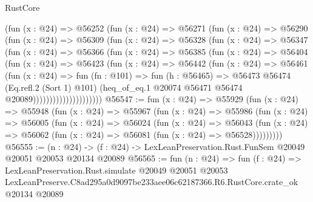 \begin{lexlean}{RustCore}
\begin{coremodule}
                  (fun (x : @24) =>
                  @56252
                    (fun (x : @24) =>
                    @56271
                      (fun (x : @24) =>
                      @56290
                        (fun (x : @24) =>
                        @56309
                          (fun (x : @24) =>
                          @56328
                            (fun (x : @24) =>
                            @56347
                              (fun (x : @24) =>
                              @56366
                                (fun (x : @24) =>
                                @56385
                                  (fun (x : @24) =>
                                  @56404
                                    (fun (x : @24) =>
                                    @56423
                                      (fun (x : @24) =>
                                      @56442
                                        (fun (x : @24) =>
                                        @56461
                                          (fun (x : @24) =>
                                          fun (fn : @101) =>
                                          fun (h : @56465) =>
                                          @56473
                                            @56474
                                            (Eq.refl.{2} (Sort 1) @101)
                                            (heq_of_eq.{1}
                                              @20074
                                              @56471
                                              @56474
                                              @20089)))))))))))))))))))))
@56547 := fun (x : @24) =>
  @55929
    (fun (x : @24) =>
    @55948
      (fun (x : @24) =>
      @55967
        (fun (x : @24) =>
        @55986
          (fun (x : @24) =>
          @56005
            (fun (x : @24) =>
            @56024
              (fun (x : @24) =>
              @56043
                (fun (x : @24) => @56062 (fun (x : @24) => @56081 (fun (x : @24) => @56528)))))))))
@56555 := (n : @24) ->
  (f : @24) -> LexLeanPreservation.Rust.FunSem @20049 @20051 @20053 @20134 @20089
@56565 := fun (n : @24) =>
  fun (f : @24) =>
  LexLeanPreservation.Rust.simulate
    @20049
    @20051
    @20053
    LexLeanPreserve.C8ad295a0d9097be233aee06c62187366.R6.RustCore.crate_ok
    @20134
    @20089
\end{coremodule}
\end{lexlean}

